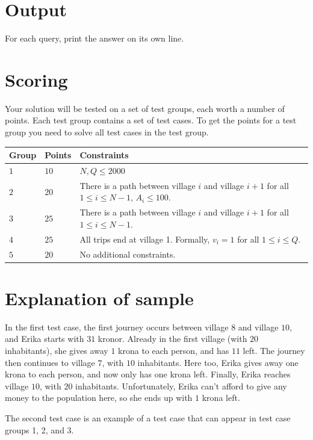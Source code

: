 \section*{Output}
For each query, print the answer on its own line.

\section*{Scoring}
Your solution will be tested on a set of test groups, each worth a number of points. Each test group contains
a set of test cases. To get the points for a test group you need to solve all test cases in the test group.

\noindent
\begin{tabular}{| l | l | p{12cm} |}
  \hline
  \textbf{Group} & \textbf{Points} & \textbf{Constraints} \\ \hline
  $1$   & $10$       & $N,Q \leq 2000$\\ \hline
  $2$   & $20$       & There is a path between village $i$ and village $i+1$ for all $1 \leq i \leq N-1$, $A_i \leq 100$. \\ \hline
  $3$   & $25$       & There is a path between village $i$ and village $i+1$ for all $1 \leq i \leq N-1$. \\ \hline
  $4$   & $25$       & All trips end at village 1. Formally, $v_i=1$ for all $1 \leq i \leq Q$. \\ \hline
  $5$   & $20$       & No additional constraints. \\ \hline
\end{tabular}


\section*{Explanation of sample}
In the first test case, the first journey occurs between village $8$ and village $10$, and Erika starts with $31$ kronor.
Already in the first village (with $20$ inhabitants), she gives away $1$ krona to each person, and has $11$ left.
The journey then continues to village $7$, with $10$ inhabitants. Here too, Erika gives away one krona to each person, and now only has one krona left.
Finally, Erika reaches village $10$, with $20$ inhabitants. Unfortunately, Erika can't afford to give any money to the population here, so she ends up with $1$ krona left.

The second test case is an example of a test case that can appear in test case groups 1, 2, and 3.

